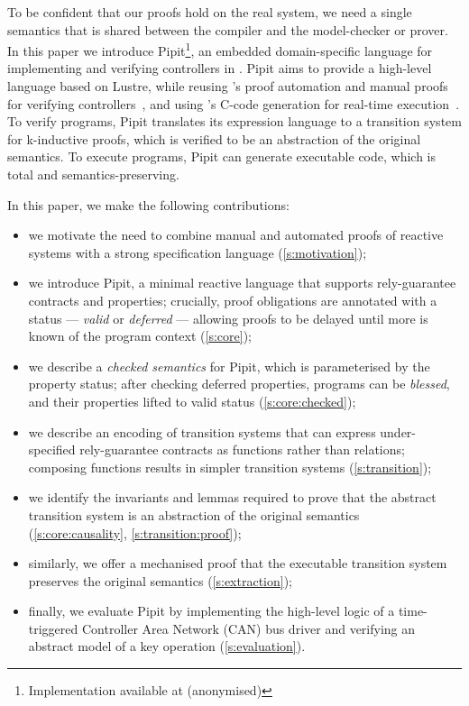 \documentclass[a4paper,UKenglish,cleveref, autoref, thm-restate,anonymous]{lipics-v2021}
\newcommand{\GITHUBURL}{(anonymised)}
\newcommand{\GITHUBURL}{\url{https://github.com/songlarknet/pipit}}
\begin{document}
To be confident that our proofs hold on the real system, we need a single semantics that is shared between the compiler and the model-checker or prover.
In this paper we introduce Pipit\footnote{Implementation available at \GITHUBURL}, an embedded domain-specific language for implementing and verifying controllers in \fstar{}.
Pipit aims to provide a high-level language based on Lustre, while reusing \fstar{}'s proof automation and manual proofs for verifying controllers~\cite{martinez2019meta}, and using \lowstar{}'s C-code generation for real-time execution~\cite{protzenko2017verified}.
To verify programs, Pipit translates its expression language to a transition system for k-inductive proofs, which is verified to be an abstraction of the original semantics.
To execute programs, Pipit can generate executable code, which is total and semantics-preserving.



In this paper, we make the following contributions:

\begin{itemize}
  \item we motivate the need to combine manual and automated proofs of reactive systems with a strong specification language (\autoref{s:motivation});
  \item we introduce Pipit, a minimal reactive language that supports rely-guarantee contracts and properties; crucially, proof obligations are annotated with a status --- \emph{valid} or \emph{deferred} --- allowing proofs to be delayed until more is known of the program context (\autoref{s:core});
  \item we describe a \emph{checked semantics} for Pipit, which is parameterised by the property status; after checking deferred properties, programs can be \emph{blessed}, and their properties lifted to valid status (\autoref{s:core:checked});
  \item we describe an encoding of transition systems that can express under-specified rely-guarantee contracts as functions rather than relations; composing functions results in simpler transition systems (\autoref{s:transition});
  \item we identify the invariants and lemmas required to prove that the abstract transition system is an abstraction of the original semantics (\autoref{s:core:causality}, \autoref{s:transition:proof});
  \item similarly, we offer a mechanised proof that the executable transition system preserves the original semantics (\autoref{s:extraction});
  \item finally, we evaluate Pipit by implementing the high-level logic of a time-triggered Controller Area Network (CAN) bus driver and verifying an abstract model of a key operation (\autoref{s:evaluation}).
\end{itemize}
 
\end{document}
